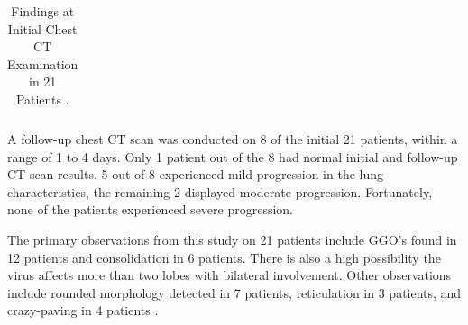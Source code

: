 \begin{longtable}{| p{} | p{} |}
 \caption{Findings at Initial Chest CT Examination in 21 Patients  \cite{CMA+2020}.}

    \label{tab:CT Scan Review Results}
    \end{longtable}

% 
A follow-up chest CT scan was conducted on 8 of the initial 21 patients, within 
a range of 1 to 4 days. Only 1 patient out of the 8 had normal initial and 
follow-up CT scan results. 5 out of 8 experienced mild progression in 
the lung characteristics, the remaining 2 displayed 
moderate progression. Fortunately, none of the patients experienced severe progression.

The primary observations from this study on 21 patients include GGO's 
found in 12 patients and consolidation in 6 patients. There is also a high possibility 
the virus affects more than two lobes with bilateral involvement. Other 
observations include rounded morphology detected in 7 patients, 
reticulation in 3 patients, and crazy-paving in 4 patients \cite{CMA+2020}.

